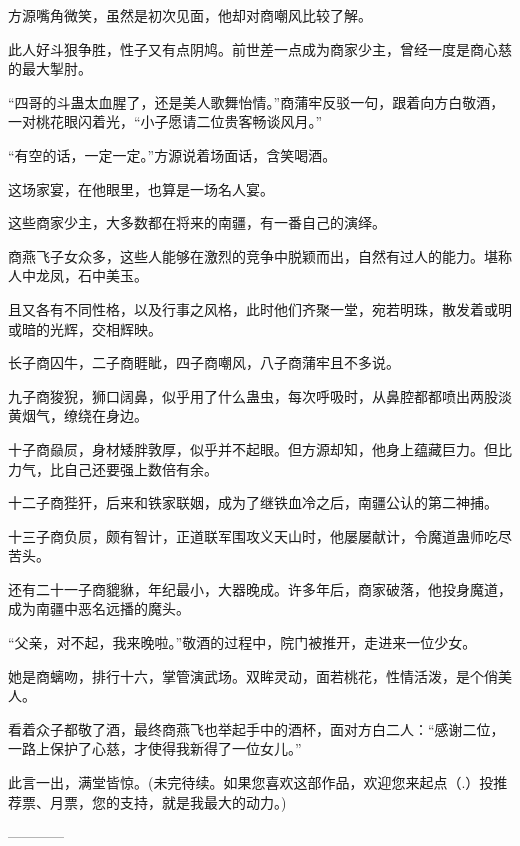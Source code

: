 \begin{this_body}
方源嘴角微笑，虽然是初次见面，他却对商嘲风比较了解。

此人好斗狠争胜，性子又有点阴鸠。前世差一点成为商家少主，曾经一度是商心慈的最大掣肘。

“四哥的斗蛊太血腥了，还是美人歌舞怡情。”商蒲牢反驳一句，跟着向方白敬酒，一对桃花眼闪着光，“小子愿请二位贵客畅谈风月。”

“有空的话，一定一定。”方源说着场面话，含笑喝酒。

这场家宴，在他眼里，也算是一场名人宴。

这些商家少主，大多数都在将来的南疆，有一番自己的演绎。

商燕飞子女众多，这些人能够在激烈的竞争中脱颖而出，自然有过人的能力。堪称人中龙凤，石中美玉。

且又各有不同性格，以及行事之风格，此时他们齐聚一堂，宛若明珠，散发着或明或暗的光辉，交相辉映。

长子商囚牛，二子商睚眦，四子商嘲风，八子商蒲牢且不多说。

九子商狻猊，狮口阔鼻，似乎用了什么蛊虫，每次呼吸时，从鼻腔都都喷出两股淡黄烟气，缭绕在身边。

十子商赑屃，身材矮胖敦厚，似乎并不起眼。但方源却知，他身上蕴藏巨力。但比力气，比自己还要强上数倍有余。

十二子商狴犴，后来和铁家联姻，成为了继铁血冷之后，南疆公认的第二神捕。

十三子商负屃，颇有智计，正道联军围攻义天山时，他屡屡献计，令魔道蛊师吃尽苦头。

还有二十一子商貔貅，年纪最小，大器晚成。许多年后，商家破落，他投身魔道，成为南疆中恶名远播的魔头。

“父亲，对不起，我来晚啦。”敬酒的过程中，院门被推开，走进来一位少女。

她是商螭吻，排行十六，掌管演武场。双眸灵动，面若桃花，性情活泼，是个俏美人。

看着众子都敬了酒，最终商燕飞也举起手中的酒杯，面对方白二人：“感谢二位，一路上保护了心慈，才使得我新得了一位女儿。”

此言一出，满堂皆惊。(未完待续。如果您喜欢这部作品，欢迎您来起点（.）投推荐票、月票，您的支持，就是我最大的动力。)

------------

\end{this_body}

